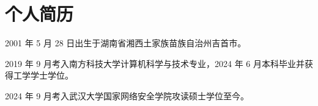 \chapter{个人简历}

2001 年 5 月 28 日出生于湖南省湘西土家族苗族自治州吉首市。

2019 年 9 月考入南方科技大学计算机科学与技术专业，2024 年 6 月本科毕业并获得工学学士学位。

2024 年 9 月考入武汉大学国家网络安全学院攻读硕士学位至今。
